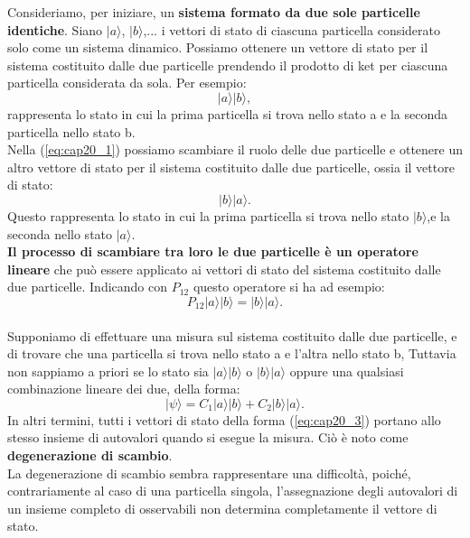 \documentclass[a4paper,12pt,oneside]{book}
\begin{document}
Consideriamo, per iniziare, un \textbf{sistema formato da due sole particelle identiche}. Siano $|a\rangle$, $|b\rangle$,... i vettori di stato di ciascuna particella considerato solo come un sistema dinamico. Possiamo ottenere un vettore di stato per il sistema costituito dalle due particelle prendendo il prodotto di ket per ciascuna particella considerata da sola. Per esempio:
	\begin{equation}
		|a\rangle|b\rangle,
	\label{eq:cap20_1}
	\end{equation}
rappresenta lo stato in cui la prima particella si trova nello stato a e la seconda particella nello stato b.\\

Nella (\ref{eq:cap20_1}) possiamo scambiare il ruolo delle due particelle e ottenere un altro vettore di stato per il sistema costituito dalle due particelle, ossia il vettore di stato:\\
	\begin{equation}
		|b\rangle|a\rangle.
	\label{eq:cap20_2}
	\end{equation}
Questo rappresenta lo stato in cui la prima particella si trova nello stato $|b\rangle$,e la seconda nello stato $|a\rangle$.\\

\textbf{Il processo di scambiare tra loro le due particelle è un operatore lineare} che può essere applicato ai vettori di stato del sistema costituito dalle due particelle. Indicando con $P_{12}$ questo operatore si ha ad esempio:
	\begin{equation}
		P_{12}|a\rangle|b\rangle = |b\rangle|a\rangle.
	\end{equation}\\
	
Supponiamo di effettuare una misura sul sistema costituito dalle due particelle, e di trovare che una particella si trova nello stato a e l'altra nello stato b, Tuttavia non sappiamo a priori se lo stato sia $|a\rangle|b\rangle$ o $|b\rangle|a\rangle$ oppure una qualsiasi combinazione lineare dei due, della forma:
	\begin{equation}
		|\psi\rangle = C_1|a\rangle|b\rangle + C_2 |b\rangle|a\rangle.
	\label{eq:cap20_3}
	\end{equation}
In altri termini, tutti i vettori di stato della forma (\ref{eq:cap20_3}) portano allo stesso insieme di autovalori quando si esegue la misura. Ciò è noto come \textbf{degenerazione di scambio}.\\

La degenerazione di scambio sembra rappresentare una difficoltà, poiché, contrariamente al caso di una particella singola, l'assegnazione degli autovalori di un insieme completo di osservabili non determina completamente il vettore di stato.\\
\end{document}
